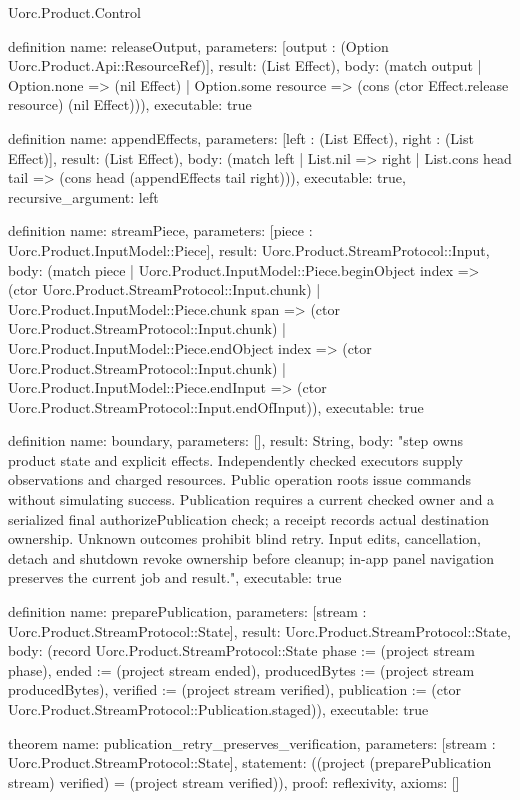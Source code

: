 \begin{lexlean}{Uorc.Product.Control}
\begin{semanticmodule}
definition{
  name: releaseOutput,
  parameters: [output : (Option Uorc.Product.Api::ResourceRef)],
  result: (List Effect),
  body: (match output
    | Option.none => (nil Effect)
    | Option.some resource => (cons (ctor Effect.release resource) (nil Effect))),
  executable: true
}

definition{
  name: appendEffects,
  parameters: [left : (List Effect), right : (List Effect)],
  result: (List Effect),
  body: (match left
    | List.nil => right
    | List.cons head tail => (cons head (appendEffects tail right))),
  executable: true,
  recursive_argument: left
}

definition{
  name: streamPiece,
  parameters: [piece : Uorc.Product.InputModel::Piece],
  result: Uorc.Product.StreamProtocol::Input,
  body: (match piece
    | Uorc.Product.InputModel::Piece.beginObject index => (ctor Uorc.Product.StreamProtocol::Input.chunk)
    | Uorc.Product.InputModel::Piece.chunk span => (ctor Uorc.Product.StreamProtocol::Input.chunk)
    | Uorc.Product.InputModel::Piece.endObject index => (ctor Uorc.Product.StreamProtocol::Input.chunk)
    | Uorc.Product.InputModel::Piece.endInput => (ctor Uorc.Product.StreamProtocol::Input.endOfInput)),
  executable: true
}

definition{
  name: boundary,
  parameters: [],
  result: String,
  body: "step owns product state and explicit effects. Independently checked executors supply observations and charged resources. Public operation roots issue commands without simulating success. Publication requires a current checked owner and a serialized final authorizePublication check; a receipt records actual destination ownership. Unknown outcomes prohibit blind retry. Input edits, cancellation, detach and shutdown revoke ownership before cleanup; in-app panel navigation preserves the current job and result.",
  executable: true
}

definition{
  name: preparePublication,
  parameters: [stream : Uorc.Product.StreamProtocol::State],
  result: Uorc.Product.StreamProtocol::State,
  body: (record Uorc.Product.StreamProtocol::State {phase := (project stream phase), ended := (project stream ended), producedBytes := (project stream producedBytes), verified := (project stream verified), publication := (ctor Uorc.Product.StreamProtocol::Publication.staged)}),
  executable: true
}

theorem{
  name: publication_retry_preserves_verification,
  parameters: [stream : Uorc.Product.StreamProtocol::State],
  statement: ((project (preparePublication stream) verified) = (project stream verified)),
  proof: reflexivity{},
  axioms: []
}


\end{semanticmodule}
\end{lexlean}
